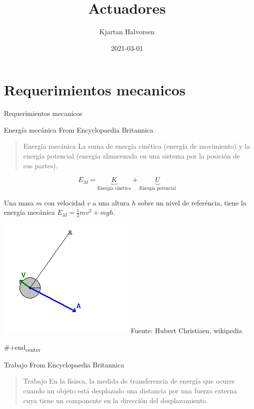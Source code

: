 \documentclass[presentation,aspectratio=169]{beamer}
\author{Kjartan Halvorsen}
\date{2021-03-01}
\title{Actuadores}
\begin{document}
\maketitle

\section{Requerimientos mecanicos}
\label{sec:org464a193}

\begin{frame}[label={sec:org3c3041c}]{Requerimientos mecanicos}
\end{frame}
\begin{frame}[label={sec:org96f87b0}]{Energía mecánica}
From Encyclopaedia Britannica
\begin{quote}
\alert{Energía mecánica} La suma de energía cinética (energía de movimiento) y la energía potencial (energía almacenada en una sistema por la posición de sus partes).
\end{quote}

\[ E_M = \underbrace{K}_{\text{Energía cinética}} + \underbrace{U}_{\text{Energía potencial}}\]

Una masa \(m\) con velocidad \(v\) a una altura \(h\) sobre un nivel de referéncia, tiene la energía mecánica \(E_M = \frac{1}{2}mv^2 + mgh\).

\begin{center}
\includegraphics[height=0.3\textheight]{../../figures/pendulum.png}
{\footnotesize Fuente: Hubert Christiaen, wikipedia}
\end{center}


\#+end\textsubscript{center}
\end{frame}
\begin{frame}[label={sec:org55e5e47}]{Trabajo}
From Encyclopaedia Britannica
\begin{quote}
\alert{Trabajo} En la físisca, la medida de \alert{transferencia de energía} que ocurre cuando un objeto está desplazado \alert{una distancia} por una \alert{fuerza externa} cuya tiene un componente en la dirección del desplazamiento.
\end{quote}
\end{frame}
\end{document}
